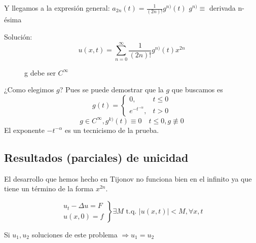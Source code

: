 			Y llegamos a la expresión general: $a_{2n} (t) = \frac{1}{(2n)!} g^{n)} (t)$
			\obs $g^{n)} \equiv$ derivada n-ésima

			Solución:
				\[ u(x,t) = \sum_{n=0}^\infty  \frac{1}{(2n)!} g^{n)} (t) x^{2n}\]

			\newpage %

			\begin{figure}[hbtp]
				\begin{minipage}[t]{0.5\textwidth}
				\end{minipage}
				\begin{minipage}[t]{0.5\textwidth}
				\end{minipage}
				\caption{g debe ser $C^\infty$}
			\end{figure}

			¿Como elegimos $g$? Pues se puede demostrar que la $g$ que buscamos es
			\[ g(t) = \begin{cases}
				0,& t \leq 0 \\
				e^{-t^{-\alpha}},&  t>0
			\end{cases}\]
			\[ g \in C^\infty, g^{k)}(t) \equiv 0 \quad t \leq 0, g \not\equiv 0\]
			\obs El exponente $-t^{-\alpha}$ es un tecnicismo de la prueba.

		\subsection{Resultados (parciales) de unicidad}

			El desarrollo que hemos hecho en Tijonov no funciona bien en el infinito ya que tiene un término de la forma $x^{2n}$.

			\begin{theorem}
				\[\left.\begin{array}{r}
					u_t - \Delta u = F \\
					u(x,0) = f
				\end{array}\right\} \exists M \text{ t.q. } |u(x,t)| < M, \forall x, t \]

				Si $u_1, u_2$ soluciones de este problema $\Rightarrow u_1 = u_2$
			\end{theorem}

